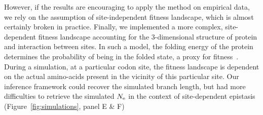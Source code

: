 However, if the results are encouraging to apply the method on empirical data, we rely on the assumption of site-independent fitness landscape, which is almost certainly broken in practice.
Finally, we implemented a more complex, site-dependent fitness landscape accounting for the $3$-dimensional structure of protein and interaction between sites.
In such a model, the folding energy of the protein determines the probability of being in the folded state, a proxy for fitness~\citep{Goldstein2017}.
During a simulation, at a particular \gls{codon} site, the fitness landscape is dependent on the actual amino-acids present in the vicinity of this particular site.
Our inference framework could recover the simulated branch length, but had more difficulties to retrieve the simulated $N_{\mathrm{e}}$ in the context of site-dependent epistasis (Figure~\ref{fig:simulations}, panel E \& F)

